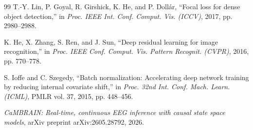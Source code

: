 \documentclass[conference]{IEEEtran}
\begin{document}
\begin{thebibliography}{99}
 T.-Y. Lin, P. Goyal, R. Girshick, K. He, and P. Doll\'ar, ``Focal loss for dense object
detection,'' in \emph{Proc. IEEE Int. Conf. Comput. Vis. (ICCV)}, 2017, pp. 2980--2988.

 K. He, X. Zhang, S. Ren, and J. Sun, ``Deep residual learning for image recognition,'' in
\emph{Proc. IEEE Conf. Comput. Vis. Pattern Recognit. (CVPR)}, 2016, pp. 770--778.

 S. Ioffe and C. Szegedy, ``Batch normalization: Accelerating deep network training by reducing
internal covariate shift,'' in \emph{Proc. 32nd Int. Conf. Mach. Learn. (ICML)}, PMLR vol. 37, 2015, pp. 448--456.

 \emph{CaMBRAIN: Real-time, continuous EEG inference with causal state space models}, arXiv
preprint arXiv:2605.28792, 2026.

\end{thebibliography}
\end{document}
